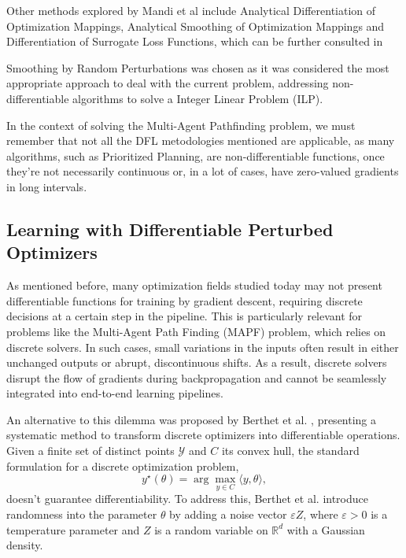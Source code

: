 Other methods explored by Mandi et al include Analytical Differentiation of Optimization Mappings, Analytical Smoothing of Optimization Mappings and Differentiation of Surrogate Loss Functions, which can be further consulted in \cite{mandiDecisionFocusedLearningFoundations2024}

Smoothing by Random Perturbations was chosen as it was considered the most appropriate approach to deal with the current problem, addressing non-differentiable algorithms to solve a Integer Linear Problem (ILP).

In the context of solving the Multi-Agent Pathfinding problem, we must remember that not all the DFL metodologies mentioned are applicable, as many algorithms, such as Prioritized Planning, are non-differentiable functions, once they're not necessarily continuous or, in a lot of cases, have zero-valued gradients in long intervals.

\subsection{Learning with Differentiable Perturbed Optimizers}

As mentioned before, many optimization fields studied today may not present differentiable functions for training by gradient descent, requiring discrete decisions at a certain step in the pipeline. This is particularly relevant for problems like the Multi-Agent Path Finding (MAPF) problem, which relies on discrete solvers. In such cases, small variations in the inputs often result in either unchanged outputs or abrupt, discontinuous shifts. As a result, discrete solvers disrupt the flow of gradients during backpropagation and cannot be seamlessly integrated into end-to-end learning pipelines.

An alternative to this dilemma was proposed by Berthet et al. \cite{berthetLearningDifferentiablePertubed2020}, presenting a systematic method to transform discrete optimizers into differentiable operations. Given a finite set of distinct points $\mathcal{Y}$ and $C$ its convex hull, the standard formulation for a discrete optimization problem, 
\[y^\star(\theta) = \arg \max_{y \in C} \langle y, \theta \rangle \tag{1},\]
doesn't guarantee differentiability. To address this, Berthet et al. introduce randomness into the parameter $\theta$ by adding a noise vector $\varepsilon Z$, where $\varepsilon > 0$ is a temperature parameter and $Z$ is a random variable on $\mathbb{R}^d$ with a Gaussian density.

